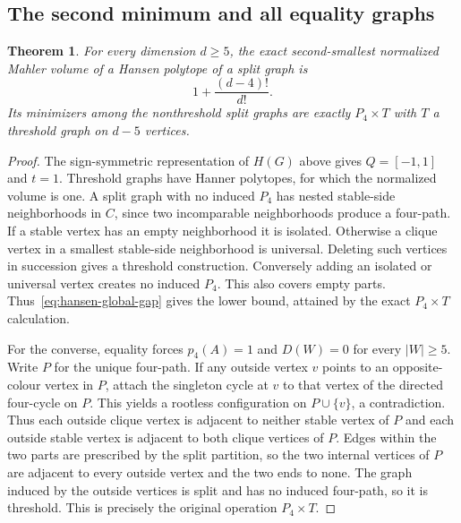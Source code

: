 \documentclass[11pt,a4paper]{article}
\numberwithin{equation}{section}
\newtheorem{theorem}{Theorem}[section]
\begin{document}
\subsection{The second minimum and all equality graphs}\begin{theorem}\label{thm:second}
For every dimension $d\ge5$, the exact second-smallest normalized Mahler volume of a Hansen polytope of a split graph is
\[
 1+\frac{(d-4)!}{d!}.
\]
Its minimizers among the nonthreshold split graphs are exactly $P_4\times T$ with $T$ a threshold graph on $d-5$ vertices. \end{theorem}\begin{proof} The sign-symmetric representation of $H(G)$ above gives $Q=[-1,1]$ and $t=1$. Threshold graphs have Hanner polytopes, for which the normalized volume is one. A split graph with no induced $P_4$ has nested stable-side neighborhoods in $C$, since two incomparable neighborhoods produce a four-path. If a stable vertex has an empty neighborhood it is isolated. Otherwise a clique vertex in a smallest stable-side neighborhood is universal. Deleting such vertices in succession gives a threshold construction. Conversely adding an isolated or universal vertex creates no induced $P_4$. This also covers empty parts. Thus~\eqref{eq:hansen-global-gap} gives the lower bound, attained by the exact $P_4\times T$ calculation.

For the converse, equality forces $p_4(A)=1$ and $D(W)=0$ for every $|W|\ge5$. Write $P$ for the unique four-path. If any outside vertex $v$ points to an opposite-colour vertex in $P$, attach the singleton cycle at $v$ to that vertex of the directed four-cycle on $P$. This yields a rootless configuration on $P\cup\{v\}$, a contradiction. Thus each outside clique vertex is adjacent to neither stable vertex of $P$ and each outside stable vertex is adjacent to both clique vertices of $P$. Edges within the two parts are prescribed by the split partition, so the two internal vertices of $P$ are adjacent to every outside vertex and the two ends to none. The graph induced by the outside vertices is split and has no induced four-path, so it is threshold. This is precisely the original operation $P_4\times T$.
\end{proof}
\end{document}
